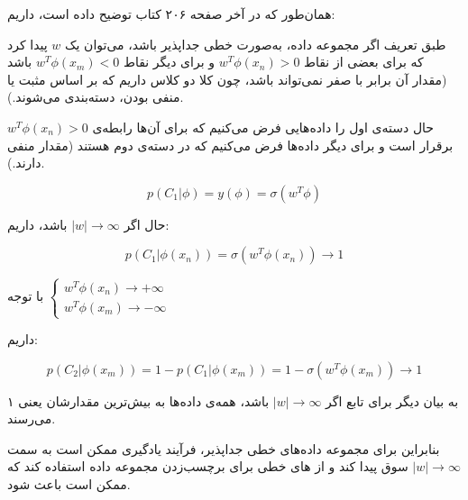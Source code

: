 
همان‌طور که در آخر صفحه ۲۰۶ کتاب  توضیح داده است، داریم:

طبق تعریف اگر مجموعه داده، به‌صورت خطی جداپذیر باشد، می‌توان یک $w$ پیدا کرد که برای بعضی از نقاط 
$ w^T\phi(x_n) > 0$
 و برای دیگر نقاط
 $ w^T\phi(x_m) < 0$
 باشد (مقدار آن برابر با صفر نمی‌تواند باشد، چون کلا دو کلاس داریم که بر اساس مثبت یا منفی بودن، دسته‌بندی می‌شوند.).
 
حال دسته‌ی اول را داده‌هایی فرض می‌کنیم که برای آن‌ها رابطه‌ی $ w^T\phi(x_n) > 0$ برقرار است و برای دیگر داده‌ها فرض می‌کنیم که در دسته‌ی دوم هستند (مقدار منفی دارند.).

$$
p(C_1|\phi) = y(\phi) = \sigma(w^T\phi)
$$

حال اگر
$|w| \rightarrow \infty$
باشد، داریم:

$$
p(C_1|\phi(x_n)) = \sigma(w^T\phi(x_n)) \rightarrow 1
$$

با توجه 
$
\begin{cases}
	w^T\phi(x_n) \rightarrow +\infty \\
	w^T\phi(x_m) \rightarrow -\infty
\end{cases}
$

داریم:

$$
p(C_2|\phi(x_m)) = 1 - p(C_1 | \phi(x_m)) = 1 - \sigma(w^T\phi(x_m)) \rightarrow 1
$$

به بیان دیگر برای تابع   اگر 
$|w| \rightarrow \infty$ باشد، همه‌ی داده‌ها به بیش‌ترین مقدارشان یعنی ۱ می‌رسند.

بنابراین برای مجموعه‌ داده‌های خطی جداپذیر، فرآیند یادگیری ممکن است به سمت 
$|w| \rightarrow \infty$
سوق پیدا کند و از های خطی برای برچسب‌زدن مجموعه داده استفاده کند که ممکن است باعث  شود.